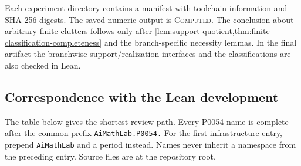 \documentclass[11pt,a4paper]{article}
\theoremstyle{definition}
\newcommand{\code}[1]{\texttt{#1}}
\newcommand{\computed}{\textsc{Computed}}
\begin{document}
Each experiment directory contains a manifest with toolchain information and
SHA-256 digests.  The saved numeric output is \computed.  The conclusion
about arbitrary finite clutters follows only after
\cref{lem:support-quotient,thm:finite-classification-completeness} and the
branch-specific necessity lemmas.  In the final artifact the branchwise
support/realization interfaces and the classifications are also checked in
Lean.

\clearpage
\begin{landscape}
\section{Correspondence with the Lean development}
\label{sec:crosswalk}

The table below gives the shortest review path.  Every P0054 name is complete
after the common prefix \code{AiMathLab.P0054.}  For the first infrastructure
entry, prepend \code{AiMathLab} and a period instead.  Names never inherit a
namespace from the preceding entry.  Source files are at the repository root.


\end{landscape}
\end{document}
